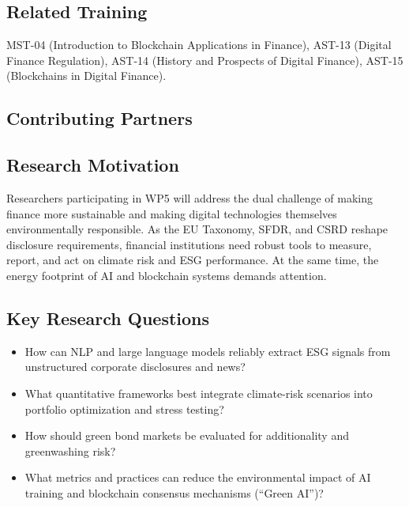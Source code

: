 \subsection*{Related Training}
MST-04 (Introduction to Blockchain Applications in Finance),
AST-13 (Digital Finance Regulation), AST-14 (History and Prospects of Digital Finance),
AST-15 (Blockchains in Digital Finance).

\subsection*{Contributing Partners}
\begin{center}
\hspace{3mm}%
\hspace{3mm}%
\hspace{3mm}%
\end{center}

\newpage


\subsection*{Research Motivation}

Researchers participating in WP5 will address the dual challenge of making
finance more sustainable and making digital technologies themselves
environmentally responsible.  As the EU Taxonomy, SFDR, and CSRD reshape
disclosure requirements, financial institutions need robust tools to measure,
report, and act on climate risk and ESG performance.  At the same time, the
energy footprint of AI and blockchain systems demands attention.

\subsection*{Key Research Questions}
\begin{itemize}[nosep]
  \item How can NLP and large language models reliably extract ESG signals from
        unstructured corporate disclosures and news?
  \item What quantitative frameworks best integrate climate-risk scenarios into
        portfolio optimization and stress testing?
  \item How should green bond markets be evaluated for additionality and
        greenwashing risk?
  \item What metrics and practices can reduce the environmental impact of
        AI training and blockchain consensus mechanisms (``Green AI'')?
\end{itemize}

